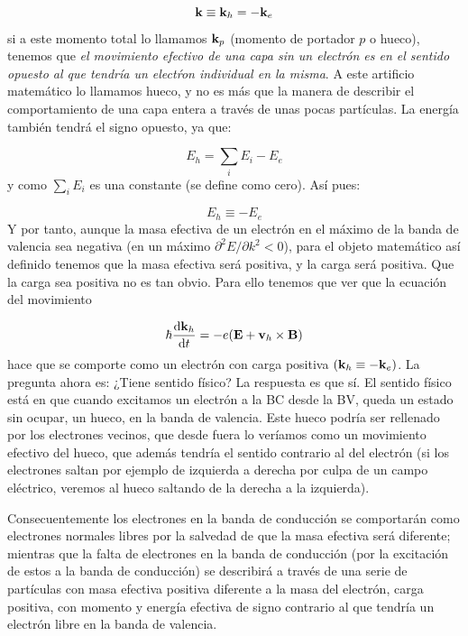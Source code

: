 \begin{equation}
	\mathbf{k} \equiv \mathbf{k}_h = - \mathbf{k}_e
\end{equation}
si a este momento total lo llamamos $\mathbf{k}_p$ (momento de portador $p$ o hueco), tenemos que \textit{el movimiento efectivo de una capa sin un electrón es en el sentido opuesto al que tendría un electŕon individual en la misma}. A este artificio matemático lo llamamos hueco, y no es más que la manera de describir el comportamiento de una capa entera a través de unas pocas partículas. La energía también tendrá el signo opuesto, ya que:

\begin{equation}
	E_h = \sum_{i} E_i - E_e
\end{equation}
y como $\sum_{i}E_i$ es una constante (se define como cero). Así pues:

\begin{equation}
	E_h \equiv - E_e
\end{equation}
Y por tanto, aunque la masa efectiva de un electrón en el máximo de la banda de valencia sea negativa (en un máximo $\partial^2 E/ \partial k^2<0$), para el objeto matemático así definido tenemos que la masa efectiva será positiva, y la carga será positiva. Que la carga sea positiva no es tan obvio. Para ello tenemos que ver que la ecuación del movimiento

\begin{equation}
	\hbar \frac{\mathrm{d} \mathbf{k}_h}{\mathrm{d} t} = -e(\mathbf{E} + \mathbf{v}_h \times \mathbf{B})
\end{equation}
hace que se comporte como un electrón con carga positiva $(\mathbf{k}_h \equiv - \mathbf{k}_e)$. La pregunta ahora es: ¿Tiene sentido físico? La respuesta es que sí. El sentido físico está en que cuando excitamos un electrón a la BC desde la BV, queda un estado sin ocupar, un hueco, en la banda de valencia. Este hueco podría ser rellenado por los electrones vecinos, que desde fuera lo veríamos como un movimiento efectivo del hueco, que además tendría el sentido contrario al del electrón (si los electrones saltan por ejemplo de izquierda a derecha por culpa de un campo eléctrico, veremos al hueco saltando de la derecha a la izquierda).

Consecuentemente los electrones en la banda de conducción se comportarán como electrones normales libres por la salvedad de que la masa efectiva será diferente; mientras que la falta de electrones en la banda de conducción (por la excitación de estos a la banda de conducción) se describirá a través de una serie de partículas con masa efectiva positiva diferente a la masa del electrón, carga positiva, con momento y energía efectiva de signo contrario al que tendría un electrón libre en la banda de valencia.


